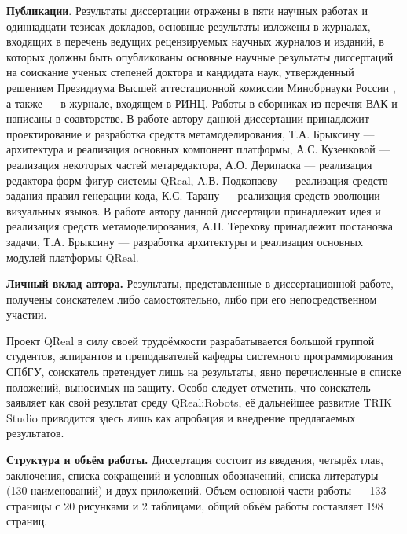 \textbf{Публикации}. Результаты диссертации отражены в пяти научных работах и одиннадцати тезисах докладов, 
основные результаты изложены в журналах, входящих в перечень ведущих рецензируемых научных 
журналов и изданий, в которых должны быть опубликованы основные научные результаты диссертаций 
на соискание ученых степеней доктора и кандидата наук, утвержденный решением Президиума 
Высшей аттестационной комиссии Минобрнауки России ,
а также \cite{terekhov2009architecture, osechkina2010gestures} --- в журнале, входящем в РИНЦ. 
Работы в сборниках из перечня ВАК  и 
написаны в соавторстве. В работе  автору данной диссертации 
принадлежит проектирование и разработка средств метамоделирования, Т.А. Брыксину --- архитектура и реализация основных
компонент платформы, А.С. Кузенковой --- реализация некоторых частей метаредактора, А.О. Дерипаска
--- реализация редактора форм фигур системы QReal, А.В. Подкопаеву --- реализация средств задания правил генерации кода,
К.С. Тарану --- реализация средств эволюции визуальных языков. В работе 
автору данной диссертации принадлежит идея и реализация средств метамоделирования, А.Н. Терехову 
принадлежит постановка задачи, Т.А. Брыксину --- разработка архитектуры и реализация основных модулей платформы QReal.

\textbf{Личный вклад автора.} Результаты, представленные в диссертационной работе, получены 
соискателем либо самостоятельно, либо при его непосредственном участии.

Проект QReal в силу своей трудоёмкости разрабатывается большой группой студентов, аспирантов
и преподавателей кафедры системного программирования СПбГУ, соискатель претендует лишь на
результаты, явно перечисленные в списке положений, выносимых на защиту. Особо следует отметить,
что соискатель заявляет как свой результат среду QReal:Robots, её дальнейшее развитие 
TRIK Studio приводится здесь лишь как апробация и внедрение предлагаемых результатов.

\textbf{Структура и объём работы.} Диссертация состоит из введения, четырёх глав, заключения, 
списка сокращений и условных обозначений, списка литературы (130 наименований) и двух 
приложений. Объем основной части работы --- 133 страницы с 20 рисунками и 2 таблицами, 
общий объём работы составляет 198 страниц.

